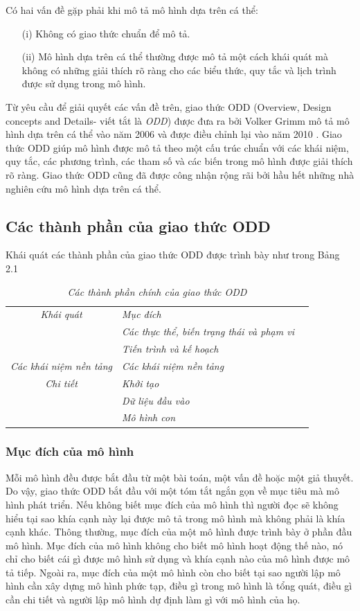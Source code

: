 \documentclass[13pt]{extreport}
\begin{document}
Có hai vấn đề gặp phải khi mô tả mô hình dựa trên cá thể:
\begin{itemize}
\item[(i)]Không có giao thức chuẩn để mô tả.
\item[(ii)]Mô hình dựa trên cá thể thường được mô tả một cách khái quát mà không có những giải thích rõ ràng cho các biểu thức, quy tắc và lịch trình được sử dụng trong mô hình.
\end{itemize}

Từ yêu cầu để giải quyết các vấn đề trên, giao thức ODD (Overview, Design concepts and Details- viết tắt là \textit{ODD}) được đưa ra bởi Volker Grimm mô tả mô hình dựa trên cá thể
vào năm 2006 và được điều chỉnh lại vào năm 2010 \cite{Grimm2006115, Grimm20102760}. Giao thức ODD giúp mô hình được mô tả theo một cấu trúc chuẩn với các khái niệm, quy tắc, các phương trình, các tham số và các biến trong mô hình được giải thích rõ ràng. Giao thức ODD cũng đã được công nhận rộng rãi bởi hầu hết những nhà nghiên cứu mô hình dựa trên cá thể.

\subsection{Các thành phần của giao thức ODD}
\indent Khái quát các thành phần của giao thức ODD được trình bày như trong Bảng 2.1

\begin{table}
\begin{tabular}{|c l|c|}
\hline
\textit{Khái quát} & \textit{Mục đích} \\  
{} & \textit{Các thực thể, biến trạng thái và phạm vi} \\ 
{} & \textit{Tiến trình và kế hoạch} \\ 
\cline{1-2}
\textit{Các khái niệm nền tảng} & \textit{Các khái niệm nền tảng} \\ 
\cline{1-2}
\textit{Chi tiết} & \textit{Khởi tạo} \\ 
{} & \textit{Dữ liệu đầu vào} \\ 
{}& \textit{Mô hình con} \\ 
\hline
\end{tabular} 
\caption{\textit{Các thành phần chính của giao thức ODD}}
\end{table}

\subsubsection{Mục đích của mô hình}
\indent Mỗi mô hình đều được bắt đầu từ một bài toán, một vấn đề hoặc một giả thuyết. Do vậy, giao thức ODD bắt đầu với một tóm tắt ngắn gọn về mục tiêu mà mô hình phát triển. Nếu không biết mục đích của mô hình thì người đọc sẽ không hiểu tại sao khía cạnh này lại được mô tả trong mô hình mà không phải là khía cạnh khác. Thông thường, mục đích của một mô hình được trình bày ở phần đầu mô hình. Mục đích của mô hình không cho biết mô hình hoạt động thế nào, nó chỉ cho biết cái gì được mô hình sử dụng và khía  cạnh nào của mô hình được mô tả tiếp. Ngoài ra, mục đích của một mô hình còn cho biết tại sao người lập mô hình cần xây dựng mô hình phức tạp, điều gì trong mô hình là tổng quát, điều gì cần chi tiết và người lập mô hình dự định làm gì với mô hình của họ.
\end{document}
